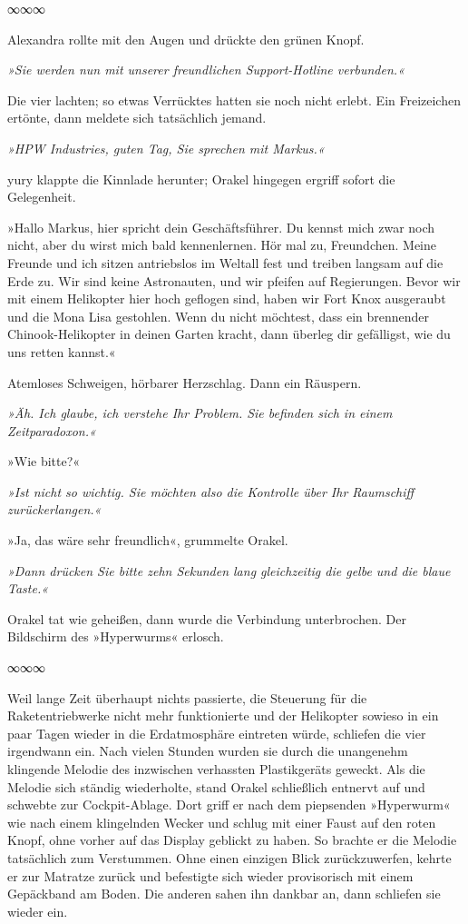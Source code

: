 \begin{center}
	∞∞∞
\end{center}

Alexandra rollte mit den Augen und drückte den grünen Knopf.

\textit{»Sie werden nun mit unserer freundlichen Support-Hotline verbunden.«}

Die vier lachten; so etwas Verrücktes hatten sie noch nicht erlebt. Ein Freizeichen ertönte, dann meldete sich tatsächlich jemand.

\textit{»HPW Industries, guten Tag, Sie sprechen mit Markus.«}

yury klappte die Kinnlade herunter; Orakel hingegen ergriff sofort die Gelegenheit.

»Hallo Markus, hier spricht dein Geschäftsführer. Du kennst mich zwar noch nicht, aber du wirst mich bald kennenlernen. Hör mal zu, Freundchen. Meine Freunde und ich sitzen antriebslos im Weltall fest und treiben langsam auf die Erde zu. Wir sind keine Astronauten, und wir pfeifen auf Regierungen. Bevor wir mit einem Helikopter hier hoch geflogen sind, haben wir Fort Knox ausgeraubt und die Mona Lisa gestohlen. Wenn du nicht möchtest, dass ein brennender Chinook-Helikopter in deinen Garten kracht, dann überleg dir gefälligst, wie du uns retten kannst.«

Atemloses Schweigen, hörbarer Herzschlag. Dann ein Räuspern.

\textit{»Äh. Ich glaube, ich verstehe Ihr Problem. Sie befinden sich in einem Zeitparadoxon.«}

»Wie bitte?«

\textit{»Ist nicht so wichtig. Sie möchten also die Kontrolle über Ihr Raumschiff zurückerlangen.«}

»Ja, das wäre sehr freundlich«, grummelte Orakel.

\textit{»Dann drücken Sie bitte zehn Sekunden lang gleichzeitig die gelbe und die blaue Taste.«}

Orakel tat wie geheißen, dann wurde die Verbindung unterbrochen. Der Bildschirm des »Hyperwurms« erlosch.

\begin{center}
	∞∞∞
\end{center}

Weil lange Zeit überhaupt nichts passierte, die Steuerung für die Raketentriebwerke nicht mehr funktionierte und der Helikopter sowieso in ein paar Tagen wieder in die Erdatmosphäre eintreten würde, schliefen die vier irgendwann ein. Nach vielen Stunden wurden sie durch die unangenehm klingende Melodie des inzwischen verhassten Plastikgeräts geweckt. Als die Melodie sich ständig wiederholte, stand Orakel schließlich entnervt auf und schwebte zur Cockpit-Ablage. Dort griff er nach dem piepsenden »Hyperwurm« wie nach einem klingelnden Wecker und schlug mit einer Faust auf den roten Knopf, ohne vorher auf das Display geblickt zu haben. So brachte er die Melodie tatsächlich zum Verstummen. Ohne einen einzigen Blick zurückzuwerfen, kehrte er zur Matratze zurück und befestigte sich wieder provisorisch mit einem Gepäckband am Boden. Die anderen sahen ihn dankbar an, dann schliefen sie wieder ein.

